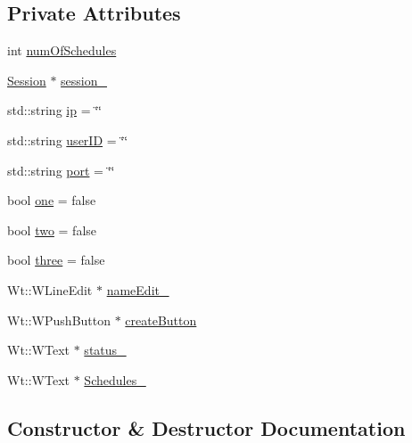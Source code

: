 \subsection*{Private Attributes}
\begin{DoxyCompactItemize}
\item 
int \hyperlink{classSchedulerControlWidget_a9743fedba173a1b29604e315d06d97fd}{num\+Of\+Schedules}
\item 
\hyperlink{classSession}{Session} $\ast$ \hyperlink{classSchedulerControlWidget_a288a93234db52da45170f791c9014459}{session\+\_\+}
\item 
std\+::string \hyperlink{classSchedulerControlWidget_a320557ef7428e36682b21d9ad3b877ba}{ip} = \char`\"{}\char`\"{}
\item 
std\+::string \hyperlink{classSchedulerControlWidget_af73ee1b98fb7944ae193d5e880a59f31}{user\+ID} = \char`\"{}\char`\"{}
\item 
std\+::string \hyperlink{classSchedulerControlWidget_add76e052c3bbb0bedfef92ff5121e8b0}{port} = \char`\"{}\char`\"{}
\item 
bool \hyperlink{classSchedulerControlWidget_a52ee400ee7ef67590ab5e2d3aa095335}{one} = false
\item 
bool \hyperlink{classSchedulerControlWidget_a77776c015d36da02cf252e0f08d9fe48}{two} = false
\item 
bool \hyperlink{classSchedulerControlWidget_ae7a161cbb41cbe616f44be386c0bf011}{three} = false
\item 
Wt\+::\+W\+Line\+Edit $\ast$ \hyperlink{classSchedulerControlWidget_afb6d2313419723521e39ee1d778efc3c}{name\+Edit\+\_\+}
\item 
Wt\+::\+W\+Push\+Button $\ast$ \hyperlink{classSchedulerControlWidget_ae2609c02e0649a2fc866746427e00967}{create\+Button}
\item 
Wt\+::\+W\+Text $\ast$ \hyperlink{classSchedulerControlWidget_acdfb4ed24b3c2ea60fe91a48390e6235}{status\+\_\+}
\item 
Wt\+::\+W\+Text $\ast$ \hyperlink{classSchedulerControlWidget_ad90a2e60df5fed38f2c824c443866f6c}{Schedules\+\_\+}
\end{DoxyCompactItemize}


\subsection{Constructor \& Destructor Documentation}
